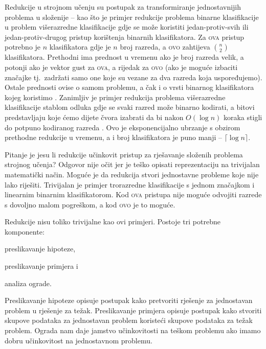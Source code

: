 Redukcije u strojnom učenju su postupak za transformiranje jednostavnijih
problema u složenije -- kao što je primjer redukcije problema binarne
klasifikacije u problem višerazredne klasifikacije gdje se može koristiti
jedan-protiv-svih  ili jedan-protiv-drugog
 pristup korištenja binarnih klasifikatora. Za
\textsc{ova} pristup potrebno je $n$ klasifikatora gdje je $n$ broj razreda, a
\textsc{ovo} zahtijeva $\binom{n}{2}$ klasifikatora. Prethodni ima prednost u
vremenu ako je broj razreda velik, a potonji ako je vektor gust za \textsc{ova},
a rijedak za \textsc{ovo} (ako je moguće izbaciti značajke tj.~zadržati samo one
koje su vezane za dva razreda koja uspoređujemo). Ostale prednosti ovise o samom
problemu, a čak i o vrsti binarnog klasifikatora kojeg koristimo
\citep{milgram2006one}. Zanimljiv je primjer redukcija problema višerazredne
klasifikacije stablom odluka  gdje se svaki razred može
binarno kodirati, a bitovi predstavljaju koje ćemo dijete čvora izabrati da bi
nakon $O(\log n)$ koraka stigli do potpuno kodiranog razreda
\citep{beygelzimer2009error, daume2016one}. Ovo je eksponencijalno ubrzanje s
obzirom prethodne redukcije u vremenu, a i broj klasifikatora je puno manji --
$\lceil \log n \rceil$.

Pitanje je jesu li redukcije učinkovit pristup za rješavanje složenih problema
strojnog učenja? Odgovor nije očit jer je teško opisati reprezentaciju na
trivijalan matematički način. Moguće je da redukcija stvori jednostavne probleme
koje nije lako riješiti. Trivijalan je primjer trorazredne klasifikacije s
jednom značajkom i linearnim binarnim klasifikatorom. Kod \textsc{ova} pristupa
nije moguće odvojiti razrede s dovoljno malom pogreškom, a kod \textsc{ovo} je
to moguće.

Redukcije nisu toliko trivijalne kao ovi primjeri. Postoje tri potrebne
komponente:
\begin{inlinelist}
  \item preslikavanje hipoteze,
  \item preslikavanje primjera i
  \item analiza ograde.
\end{inlinelist}
Preslikavanje hipoteze opisuje postupak kako pretvoriti rješenje za jednostavan
problem u rješenje za težak. Preslikavanje primjera opisuje postupak kako
stvoriti skupove podataka za jednostavan problem koristeći skupove podataka za
težak problem. Ograda nam daje jamstvo učinkovitosti na teškom problemu ako
imamo dobru učinkovitost na jednostavnom problemu.

